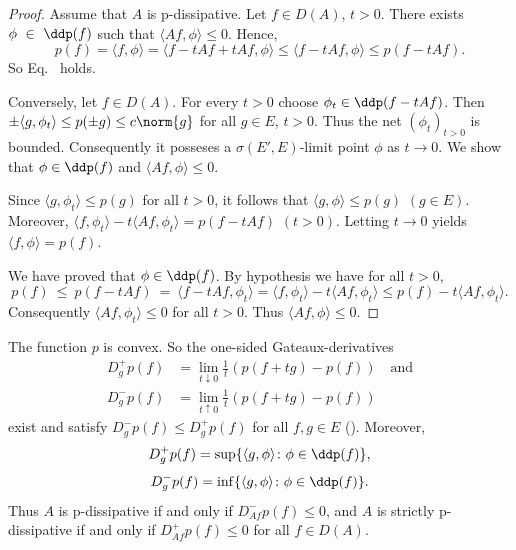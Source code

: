 \begin{proof}
Assume that $A$ is p-dissipative.
Let $f \in D(A)$,  $t > 0$.
There exists  $\phi~\in~\ddp(f)$ such that $\langle Af,\phi \rangle \leq 0$.
Hence, 
\[
p(f) = \langle f,\phi \rangle = \langle f - tAf + tAf, \phi \rangle \leq \langle f - tAf,\phi \rangle \leq p(f - tAf).
\] 
So Eq.~ holds.

Conversely, let $f \in D(A)$.
For every $t > 0$ choose $\phi_{t} \in \ddp(f - tAf)$.
Then $\pm\langle g,\phi_{t} \rangle \leq p(\pm g) \leq c\norm{g}$ for all $g \in E$, $t > 0$.
Thus the net $(\phi_{t})_{t>0}$ is bounded.
Consequently it posseses a $\sigma(E',E)$-limit point $\phi$ as $t \to 0$.
We show that $\phi \in \ddp(f)$ and $\langle Af,\phi \rangle \leq 0$.

Since $\langle g,\phi_{t} \rangle \leq p(g)$ for all $t > 0$, it follows that $\langle g,\phi \rangle \leq p(g)$ $(g \in E)$.
Moreover, $\langle f,\phi_{t} \rangle - t\langle Af, \phi_{t} \rangle = p(f - tAf)$ $(t > 0)$.
Letting $t \to 0$ yields $\langle f,\phi \rangle = p(f)$.

We have proved that $\phi \in \ddp(f)$.
By hypothesis we have for all $t > 0$, \\
%
\[
	p(f)~\leq~p(f-tAf)~=~\langle f-tAf,\phi_{t} \rangle 
= \langle f,\phi_{t} \rangle - t\langle Af,\phi_{t} \rangle \leq p(f) - t\langle Af,\phi_{t} \rangle .
\]
%
Consequently $\langle Af,\phi_{t} \rangle \leq 0$ for all $t > 0$.
Thus $\langle Af,\phi \rangle \leq 0$.
\end{proof}
\begin{remark}\label{rem:a2-2.4}
The function $p$ is convex.
So the one-sided Gateaux-derivatives
\begin{align*}
D^{+}_{g} p(f) &= \lim_{t \downarrow 0} \frac{1}{t} (p(f+tg) - p(f)) \quad \text{and} \\
D^{-}_{g} p(f) &= \lim_{t \uparrow 0} \frac{1}{t} (p(f+tg) - p(f))
\end{align*}
exist and satisfy $D^{-}_{g}p(f) \leq D^{+}_{g}p(f)$ for all $f, g \in E$ (\cf \textcite{moreau:1966}).
Moreover,
\begin{equation}\label{eq:a2-2.9}
D^{+}_{g} p(f) = \sup \{\langle g,\phi \rangle \colon \phi \in \ddp(f)\},
\end{equation}
\begin{equation}\label{eq:a2-2.10}
D^{-}_{g} p(f) = \inf \{\langle g,\phi \rangle \colon \phi \in \ddp(f)\}.
\end{equation}
Thus $A$ is p-dissipative if and only if\/ $D^{-}_{Af} p(f) \leq 0$, and $A$ is strictly p-dissipative if and only if\/ $D^{+}_{Af} p(f) \leq 0$ for all $f \in D(A)$.
\end{remark}

